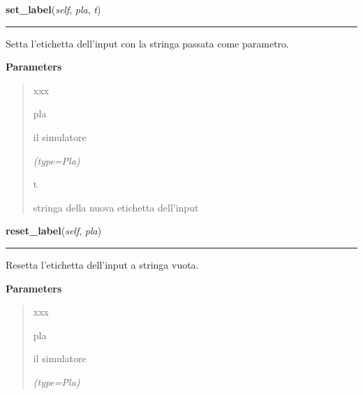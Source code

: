 \hspace{.8\funcindent}\begin{boxedminipage}{\funcwidth}

    \raggedright \textbf{set\_label}(\textit{self}, \textit{pla}, \textit{t})

    \vspace{-1.5ex}

    \rule{\textwidth}{0.5\fboxrule}
\setlength{\parskip}{2ex}
    Setta l'etichetta dell'input con la stringa passata come parametro.

\setlength{\parskip}{1ex}
      \textbf{Parameters}
      \vspace{-1ex}

      \begin{quote}
        \begin{Ventry}{xxx}

          \item[pla]

          il simulatore

            {\it (type=Pla)}

          \item[t]

          stringa della nuova etichetta dell'input

        \end{Ventry}

      \end{quote}

    \end{boxedminipage}

    \label{component:InPin:reset_label}

    \vspace{0.5ex}

\hspace{.8\funcindent}\begin{boxedminipage}{\funcwidth}

    \raggedright \textbf{reset\_label}(\textit{self}, \textit{pla})

    \vspace{-1.5ex}

    \rule{\textwidth}{0.5\fboxrule}
\setlength{\parskip}{2ex}
    Resetta l'etichetta dell'input a stringa vuota.

\setlength{\parskip}{1ex}
      \textbf{Parameters}
      \vspace{-1ex}

      \begin{quote}
        \begin{Ventry}{xxx}

          \item[pla]

          il simulatore

            {\it (type=Pla)}

        \end{Ventry}

      \end{quote}

    \end{boxedminipage}

